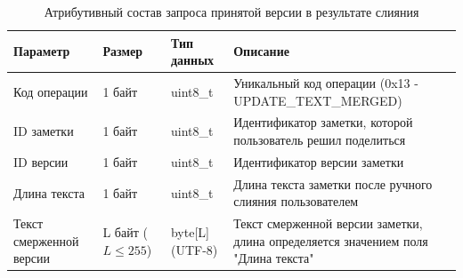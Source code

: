 \begin{table}[H]
    \centering
    \caption{Атрибутивный состав запроса принятой версии в результате слияния}
    \begin{tabular}{|p{4cm}|p{2cm}|p{3cm}|p{6cm}|}
    \hline
    \textbf{Параметр} & \textbf{Размер} & \textbf{Тип данных} & \textbf{Описание} \\ \hline
    Код операции & 1 байт & uint8\_t & Уникальный код операции (0x13 - UPDATE\_TEXT\_MERGED) \\ \hline
    ID заметки & 1 байт & uint8\_t & Идентификатор заметки, которой пользователь решил поделиться \\ \hline
    ID версии & 1 байт & uint8\_t & Идентификатор версии заметки \\ \hline
    Длина текста & 1 байт & uint8\_t & Длина текста заметки после ручного слияния пользователем \\ \hline
    Текст смерженной версии & L байт (\(L \le 255\)) & byte[L] (UTF-8) & Текст смерженной версии заметки, длина определяется значением поля "Длина текста" \\ \hline
    \end{tabular}
    \label{tab:note_create_request}
\end{table}















